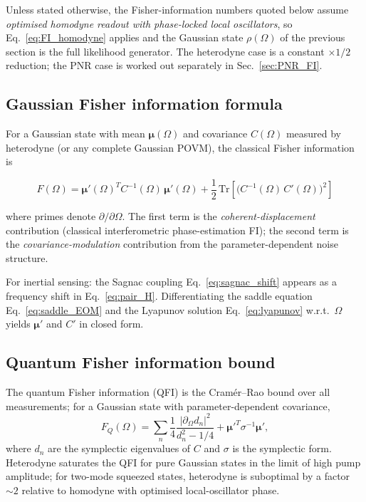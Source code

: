 \documentclass[11pt]{article}
\begin{document}
\begin{warnbox}
Unless stated otherwise, the Fisher-information numbers quoted below
assume \emph{optimised homodyne readout with phase-locked local
oscillators}, so Eq.~\eqref{eq:FI_homodyne} applies and the
Gaussian state $\rho(\Omega)$ of the previous section is the full
likelihood generator.  The heterodyne case is a constant
$\times 1/2$ reduction; the PNR case is worked out separately in
Sec.~\ref{sec:PNR_FI}.
\end{warnbox}

\subsection{Gaussian Fisher information formula}

For a Gaussian state with mean $\boldsymbol{\mu}(\Omega)$ and covariance
$C(\Omega)$ measured by heterodyne (or any complete Gaussian POVM), the
classical Fisher information is~\cite{Paris2009,Serafini2017}
\begin{keyresult}
\begin{equation}
  \boxed{
  F(\Omega) = \boldsymbol{\mu}'(\Omega)^T C^{-1}(\Omega)\,\boldsymbol{\mu}'(\Omega)
  + \frac{1}{2}\,\mathrm{Tr}\!\left[
    \bigl(C^{-1}(\Omega)\,C'(\Omega)\bigr)^2\right]
  }
  \label{eq:gaussian_FI}
\end{equation}
\end{keyresult}
where primes denote $\partial/\partial\Omega$.  The first term is the
\emph{coherent-displacement} contribution (classical interferometric
phase-estimation FI); the second term is the \emph{covariance-modulation}
contribution from the parameter-dependent noise structure.

For inertial sensing: the Sagnac coupling
Eq.~\eqref{eq:sagnac_shift} appears as a frequency shift in
Eq.~\eqref{eq:pair_H}.  Differentiating the saddle equation
Eq.~\eqref{eq:saddle_EOM} and the Lyapunov solution
Eq.~\eqref{eq:lyapunov} w.r.t.\ $\Omega$ yields $\boldsymbol{\mu}'$
and $C'$ in closed form.

\subsection{Quantum Fisher information bound}

The quantum Fisher information (QFI) is the Cram\'er--Rao bound over
all measurements; for a Gaussian state with parameter-dependent
covariance,
\begin{equation}
  F_Q(\Omega) = \sum_n \frac{1}{4}\frac{|\partial_\Omega d_n|^2}{d_n^2-1/4}
  + \boldsymbol{\mu}'^T \sigma^{-1}\boldsymbol{\mu}',
  \label{eq:QFI}
\end{equation}
where $d_n$ are the symplectic eigenvalues of $C$ and $\sigma$ is the
symplectic form.  Heterodyne saturates the QFI for pure Gaussian states
in the limit of high pump amplitude; for two-mode squeezed states,
heterodyne is suboptimal by a factor $\sim 2$ relative to homodyne with
optimised local-oscillator phase.
\end{document}

